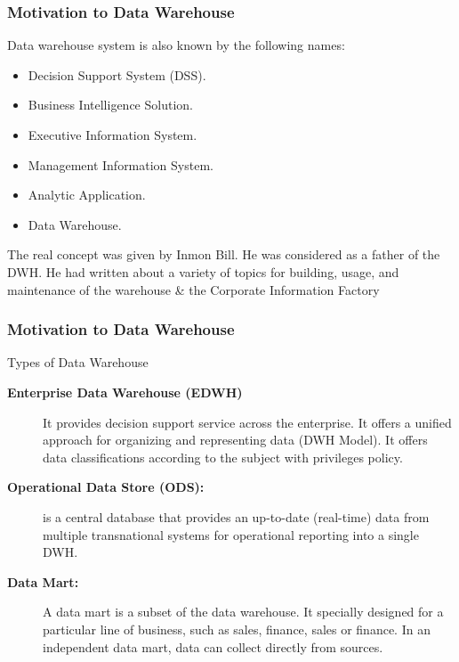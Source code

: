 \begin{frame}
\frametitle{Motivation to Data Warehouse}

Data warehouse system is also known by the following names:


\begin{itemize}
\item Decision Support System (DSS).
\item Business Intelligence Solution.
\item Executive Information System.
\item Management Information System.
\item Analytic Application.
\item Data Warehouse.

\end{itemize}

The real concept was given by Inmon Bill. He was considered as a father of the DWH. He had written about a variety of topics for building, usage, and maintenance of the warehouse \& the Corporate Information Factory

\end{frame}

\begin{frame}
\frametitle{Motivation to Data Warehouse}
Types of Data Warehouse
	\begin{description}
		\item [\textbf{Enterprise Data Warehouse (EDWH)}] It provides decision support service across the enterprise. It offers a unified approach for organizing and representing data (DWH Model). It offers data classifications according to the subject with privileges policy.
		\item [\textbf{Operational Data Store (ODS):}] is a central database that provides an up-to-date (real-time) data from multiple transnational systems for operational reporting into a single DWH.
		
		\item [\textbf{Data Mart:}] A data mart is a subset of the data warehouse. It specially designed for a particular line of business, such as sales, finance, sales or finance. In an independent data mart, data can collect directly from sources.
	\end{description}

\end{frame}

